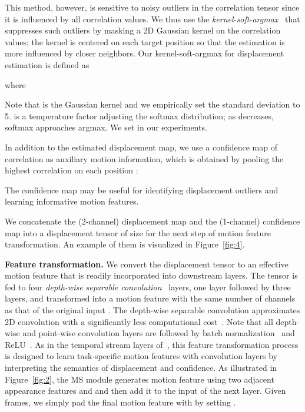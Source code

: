 \documentclass[runningheads]{llncs}
\begin{document}
This method, however, is sensitive to noisy outliers in the correlation tensor since it is influenced by all correlation values.
We thus use the {\em kernel-soft-argmax}~\cite{lee2019sfnet} that suppresses such outliers by masking a 2D Gaussian kernel on the correlation values; 
the kernel is centered on each target position so that the estimation is more influenced by closer neighbors.
Our kernel-soft-argmax for displacement estimation is defined as 

where

Note that  is the Gaussian kernel and we empirically set the standard deviation  to 5.
 is a temperature factor adjusting the softmax distribution; as  decreases, softmax approaches argmax.
We set  in our experiments.

In addition to the estimated displacement map, we use a confidence map of correlation as auxiliary motion information, which is obtained by pooling the highest correlation on each position : 

The confidence map may be useful for identifying displacement outliers and learning informative motion features.

We concatenate the (2-channel) displacement map and the (1-channel) confidence map into a displacement tensor  of size  for the next step of motion feature transformation. An example of them is visualized in Figure~\ref{fig:4}.


\smallbreak
\noindent
\textbf{Feature transformation.}
We convert the displacement tensor  to an effective motion feature  that is readily incorporated into downstream layers.
The tensor  is fed to four \textit{depth-wise separable convolution}~\cite{howard2017mobilenets} layers, one  layer followed by three  layers, and transformed into a motion feature  with the same number of channels  as that of the original input .
The depth-wise separable convolution approximates 2D convolution with a significantly less computational cost~\cite{chollet2017xception,sandler2018mobilenetv2,tran2019video}.
Note that all depth-wise and point-wise convolution layers are followed by batch normalization~\cite{ioffe2015batch} and ReLU~\cite{nair2010rectified}.
As in the temporal stream layers of~\cite{simonyan2014two}, this feature transformation process is designed to learn task-specific motion features with convolution layers by interpreting the semantics of displacement and confidence.
As illustrated in Figure~\ref{fig:2}, the MS module generates motion feature  using two adjacent appearance features  and  and then add it to the input of the next layer. Given  frames, we simply pad the final motion feature  with  by setting . 
\end{document}
